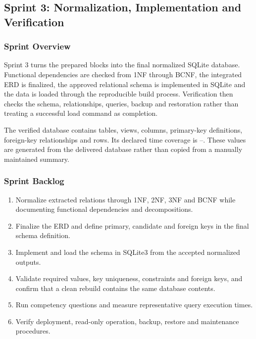 \subsection{Sprint 3: Normalization, Implementation and Verification}
\label{subsec:sprint3}

\subsubsection{Sprint Overview}

Sprint 3 turns the prepared blocks into the final normalized SQLite database.
Functional dependencies are checked from 1NF through BCNF, the integrated ERD
is finalized, the approved relational schema is implemented in SQLite and the data is
loaded through the reproducible build process. Verification then checks the
schema, relationships, queries, backup and restoration rather than treating a
successful load command as completion.

The verified database contains \mDbTables{} tables, \mDbViews{} views,
\mDbColumns{} columns, \mDbPk{} primary-key definitions,
\mDbFk{} foreign-key relationships and \mDbRows{} rows. Its declared time
coverage is \mYearMin--\mYearMax. These values are generated from the delivered
database rather than copied from a manually maintained summary.

\subsubsection{Sprint Backlog}

\begin{enumerate}[leftmargin=*]
  \item Normalize extracted relations through 1NF, 2NF, 3NF and BCNF while
  documenting functional dependencies and decompositions.
  \item Finalize the ERD and define primary, candidate and foreign keys in the
  final schema definition.
  \item Implement and load the schema in SQLite3 from the accepted normalized
  outputs.
  \item Validate required values, key uniqueness, constraints and foreign keys,
  and confirm that a clean rebuild contains the same database contents.
  \item Run competency questions and measure representative query execution
  times.
  \item Verify deployment, read-only operation, backup, restore and maintenance
  procedures.
\end{enumerate}


